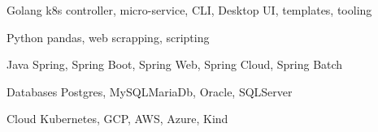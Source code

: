 

\begin{cvskills}

  \cvskill
    {Golang} %
    {k8s controller, micro-service, CLI, Desktop UI, templates, tooling} %

  \cvskill
    {Python} %
    {pandas, web scrapping, scripting} %

  \cvskill
    {Java} %
    {Spring, Spring Boot, Spring Web, Spring Cloud, Spring Batch} %

  \cvskill
    {Databases} %
    {Postgres, MySQL\/MariaDb, Oracle, SQLServer} %

  \cvskill
    {Cloud} %
    {Kubernetes, GCP, AWS, Azure, Kind} %

\end{cvskills}
